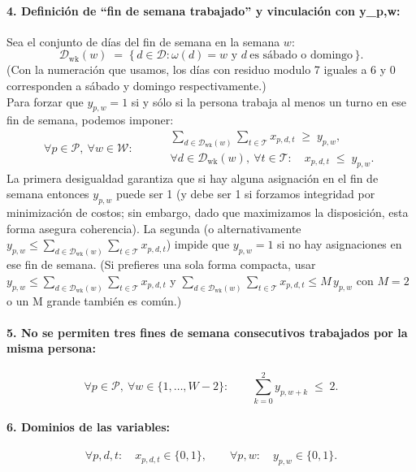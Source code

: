 \documentclass{article}
\begin{document}
\paragraph{4. Definición de ``fin de semana trabajado'' y vinculación con y_{p,w}:}
Sea el conjunto de días del fin de semana en la semana \(w\):
\[
\mathcal{D}_{\text{wk}}(w) \;=\; \{\, d\in\mathcal{D} : \omega(d)=w \text{ y } d\ \text{es sábado o domingo}\,\}.
\]
(Con la numeración que usamos, los días con residuo modulo 7 iguales a 6 y 0 corresponden a sábado y domingo respectivamente.)\\
Para forzar que \(y_{p,w}=1\) si y sólo si la persona trabaja al menos un turno en ese fin de semana, podemos imponer:
\[
\forall p\in\mathcal{P},\ \forall w\in\mathcal{W}:\qquad
\begin{aligned}
&\sum_{d\in\mathcal{D}_{\text{wk}}(w)}\sum_{t\in\mathcal{T}} x_{p,d,t} \;\ge\; y_{p,w},\\
&\forall d\in\mathcal{D}_{\text{wk}}(w),\ \forall t\in\mathcal{T}:\quad x_{p,d,t} \;\le\; y_{p,w}.
\end{aligned}
\tag{R4}
\]
La primera desigualdad garantiza que si hay alguna asignación en el fin de semana entonces \(y_{p,w}\) puede ser 1 (y debe ser 1 si forzamos integridad por minimización de costos; sin embargo, dado que maximizamos la disposici\'on, esta forma asegura coherencia). La segunda (o alternativamente \(y_{p,w} \le \sum_{d\in\mathcal{D}_{\text{wk}}(w)}\sum_{t\in\mathcal{T}} x_{p,d,t}\)) impide que \(y_{p,w}=1\) si no hay asignaciones en ese fin de semana. (Si prefieres una sola forma compacta, usar
\(y_{p,w} \le \sum_{d\in\mathcal{D}_{\text{wk}}(w)}\sum_{t\in\mathcal{T}} x_{p,d,t}\)
y
\(\sum_{d\in\mathcal{D}_{\text{wk}}(w)}\sum_{t\in\mathcal{T}} x_{p,d,t} \le M\, y_{p,w}\)
con \(M=2\) o un M grande también es común.)

\paragraph{5. No se permiten tres fines de semana consecutivos trabajados por la misma persona:}
\[
\forall p\in\mathcal{P},\ \forall w\in\{1,\dots,W-2\}:\qquad
\sum_{k=0}^{2} y_{p,w+k} \;\le\; 2.
\tag{R5}
\]

\paragraph{6. Dominios de las variables:}
\[
\forall p,d,t:\quad x_{p,d,t}\in\{0,1\},\qquad
\forall p,w:\quad y_{p,w}\in\{0,1\}.
\tag{R6}
\]
\end{document}
